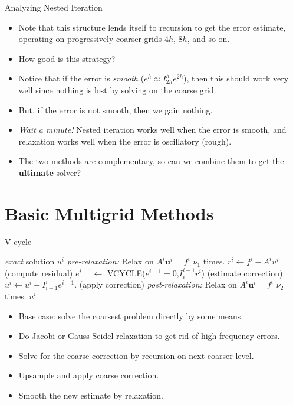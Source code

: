 \documentclass{beamer}
\begin{document}
\begin{frame}{Analyzing Nested Iteration}
 \begin{itemize}
  \item Note that this structure lends itself to recursion to get the error
        estimate, operating on progressively coarser grids $4h$, $8h$, and so on.
  \item How good is this strategy?
  \item Notice that if the error is \textit{smooth} ($e^h \approx I_{2h}^{h}e^{2h}$),
        then this should work very well since nothing is lost by solving on
        the coarse grid.
  \item But, if the error is not smooth, then we gain nothing.
  \item \textit{Wait a minute!} Nested iteration works well when the error
        is smooth, and relaxation works well when the error is oscillatory (rough).
  \item The two methods are complementary, so can we combine them to get the
        \textbf{ultimate} solver?
 \end{itemize}
\end{frame}

\section{Basic Multigrid Methods}%

\begin{frame}{V-cycle}
 \begin{algorithmic}[1]
   \Return \textit{exact} solution $u^i$
  \EndIf
  \State \textit{pre-relaxation:} Relax on $A^i\mathbf{u}^i = f^i$ $\nu_1$ times.
  \State $r^i \gets f^i - A^iu^i$ (compute residual)
  \State $e^{i-1} \gets$ VCYCLE($e^{i-1} = 0$,$I_i^{i-1}r^i$) (estimate correction)
  \State $u^i \gets u^i + I_{i-1}^i e^{i-1}$. (apply correction)
  \State \textit{post-relaxation:} Relax on $A^i\mathbf{u}^i = f^i$ $\nu_2$ times.
  \State \Return $u^i$
  \EndFunction
 \end{algorithmic}

 \begin{itemize}
  \item Base case: solve the coarsest problem directly by some means.
  \item Do Jacobi or Gauss-Seidel relaxation to get rid of high-frequency errors.
  \item Solve for the coarse correction by recursion on next coarser level.
  \item Upsample and apply coarse correction.
  \item Smooth the new estimate by relaxation.
 \end{itemize}
\end{frame}
\end{document}
